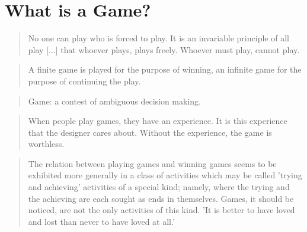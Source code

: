 
\section{What is a Game?}

\begin{frame}[standout]
    \onslide<+->
\end{frame}

\begin{frame}[standout]
    \onslide<+->
\end{frame}

\begin{frame}{\insertsection}
    \onslide<+->
    \blockquote[\cite{carse1986FiniteInfiniteGames}]{No one can play who is forced to play. It is an invariable principle of all play [...] that whoever plays, plays freely. Whoever must play, cannot play.}

    \vspace{2em}

    \onslide<+->
    \blockquote[\cite{carse1986FiniteInfiniteGames}]{A finite game is played for the purpose of winning, an infinite game for the purpose of continuing the play.}

    \vspace{2em}

    \onslide<+->
    \blockquote[\cite{burgun2013GameDesignTheory}]{Game: a contest of ambiguous decision making.}

    \vspace{2em}

    \onslide<+->
    \blockquote[\cite{schell2019ArtGameDesign}]{When people play games, they have an experience. It is this experience that the designer cares about. Without the experience, the game is worthless.}
\end{frame}

\begin{frame}{\insertsection}
    \onslide<+->
    \blockquote[\cite{suits1978GrasshopperGamesLife}]{The relation between playing games and winning games seems to be exhibited more generally in a class of activities which may be called 'trying and achieving' activities of a special kind; namely, where the trying and the achieving are each sought as ends in themselves. Games, it should be noticed, are not the only activities of this kind. 'It is better to have loved and lost than never to have loved at all.'}
\end{frame}

